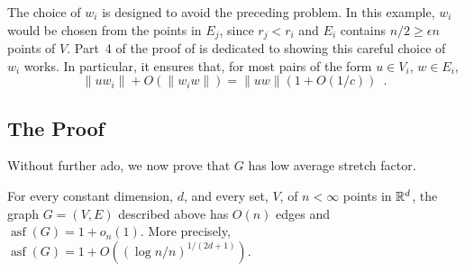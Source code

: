 \documentclass{patmorin}
\DeclareMathOperator{\asf}{asf}
\begin{document}
The choice of $w_i$ is designed to avoid the preceding problem.  In this
example, $w_i$ would be chosen from the points in $E_j$, since $r_j <
r_i$ and $E_i$ contains $n/2\ge \epsilon n$ points of $V$.  Part~4 of
the proof of  is dedicated to showing this careful
choice of $w_i$ works.  In particular, it ensures that, for most pairs
of the form $u\in V_i$, $w\in E_i$,
\[
    \|uw_i\| + O(\|w_iw\|) = \|uw\|(1+O(1/c)) \enspace .
\]

\subsection{The Proof}

Without further ado, we now prove that $G$ has low average stretch factor.

\begin{thm}
  For every constant dimension, $d$, and every set, $V$, of
  $n<\infty$ points in $\mathbb{R}^d$, the graph $G=(V,E)$ described above
  has $O(n)$ edges and $\asf(G)=1+o_n(1)$.  More precisely,
  $\asf(G)=1+O((\log n/n)^{1/(2d+1)})$.
\end{thm}
\end{document}
